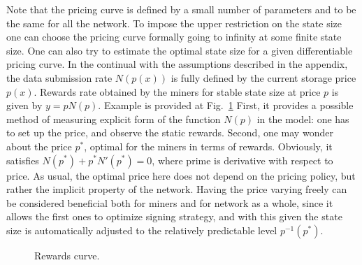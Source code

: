\documentclass[]{llncs}   %
\begin{document}
Note that the pricing curve is defined by a small number of parameters and
to be the same for all the network. To impose the upper restriction on the state
size one can choose the pricing curve formally going to infinity at some finite
state size. One can also try to estimate the optimal state size for a given
differentiable pricing curve. In the continual with the assumptions
described in the appendix, the data submission rate $N(p(x))$ is fully defined by the
current storage price $p(x)$.  Rewards rate obtained by the miners for stable
state size at price $p$ is given by $y=pN(p)$. Example is provided at
Fig.~\ref{fig:rewards} First, it provides a possible method of measuring
explicit form of the function $N(p)$ in the model: one has to set up the price,
and observe the static rewards. Second, one may wonder about the price $p^*$,
optimal for the miners in terms of rewards. Obviously, it satisfies
$N(p^*)+p^*N'(p^*)=0$, where prime is derivative with respect to price. As
usual, the optimal price here does not depend on the pricing policy, but rather
the implicit property of the network.  Having the price varying freely can be
considered beneficial both for miners and for network as a whole, since it
allows the first ones to optimize signing strategy, and with this given the
state size is automatically adjusted to the relatively predictable level
$p^{-1}(p^*)$.

\begin{figure}
    
    \caption{
        \label{fig:rewards} Rewards curve.
    }
\end{figure}
\end{document}
